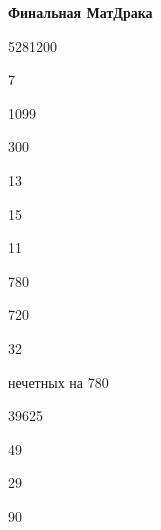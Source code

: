 \centerline{\bf \Huge Финальная МатДрака}

 5281200

 7

 1099

 300

 13

 15

 11

 780

 720

 32

 нечетных на 780

 39625

 49

 29

 90